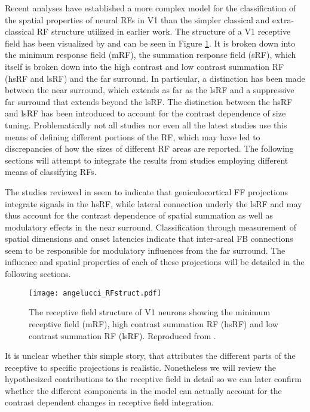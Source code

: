 Recent analyses have established a more complex model for the
classification of the spatial properties of neural RFs in V1 than the
simpler classical and extra-classical RF structure utilized in earlier
work. The structure of a V1 receptive field has been visualized by
\cite{Angelucci2006a} and can be seen in Figure \ref{RFstruct}. It is
broken down into the minimum response field (mRF), the summation
response field (sRF), which itself is broken down into the high
contrast and low contrast summation RF (hsRF and lsRF) and the far
surround. In particular, a distinction has been made between the near
surround, which extends as far as the lsRF and a suppressive far
surround that extends beyond the lsRF. The distinction between the
hsRF and lsRF has been introduced to account for the contrast
dependence of size tuning. Problematically not all studies nor even
all the latest studies use this means of defining different portions
of the RF, which may have led to discrepancies of how the sizes of
different RF areas are reported. The following sections will attempt
to integrate the results from studies employing different means of
classifying RFs.

The studies reviewed in \cite{Angelucci2006a} seem to indicate that
geniculocortical FF projections integrate signals in the hsRF, while
lateral connection underly the lsRF and may thus account for the
contrast dependence of spatial summation as well as modulatory effects
in the near surround. Classification through measurement of spatial
dimensions and onset latencies indicate that inter-areal FB
connections seem to be responsible for modulatory influences from the
far surround. The influence and spatial properties of each of these
projections will be detailed in the following sections.

\begin{figure}
	\centering
        \texttt{[image: angelucci\_RFstruct.pdf]}
	\caption[The structure of a receptive field in V1. Reproduced from
      \cite{Angelucci2006}.]{The receptive field structure of V1
      neurons showing the minimum receptive field (mRF), high contrast
      summation RF (hsRF) and low contrast summation RF
      (lsRF). Reproduced from \cite{Angelucci2006}.}
	\label{RFstruct}
\end{figure}

It is unclear whether this simple story, that attributes the different
parts of the receptive to specific projections is
realistic. Nonetheless we will review the hypothesized contributions
to the receptive field in detail so we can later confirm whether the
different components in the model can actually account for the
contrast dependent changes in receptive field integration.

